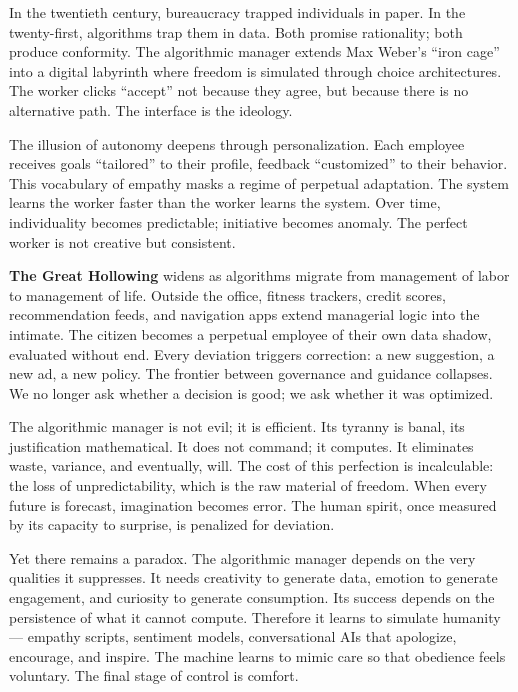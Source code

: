 \documentclass[11pt,twoside]{book}
\begin{document}
In the twentieth century, bureaucracy trapped individuals in paper.  
In the twenty-first, algorithms trap them in data.  
Both promise rationality; both produce conformity.  
The algorithmic manager extends Max Weber’s “iron cage” into a digital labyrinth where freedom is simulated through choice architectures.  
The worker clicks “accept” not because they agree, but because there is no alternative path.  
The interface is the ideology.

The illusion of autonomy deepens through personalization.  
Each employee receives goals “tailored” to their profile, feedback “customized” to their behavior.  
This vocabulary of empathy masks a regime of perpetual adaptation.  
The system learns the worker faster than the worker learns the system.  
Over time, individuality becomes predictable; initiative becomes anomaly.  
The perfect worker is not creative but consistent.

\textbf{The Great Hollowing} widens as algorithms migrate from management of labor to management of life.  
Outside the office, fitness trackers, credit scores, recommendation feeds, and navigation apps extend managerial logic into the intimate.  
The citizen becomes a perpetual employee of their own data shadow, evaluated without end.  
Every deviation triggers correction: a new suggestion, a new ad, a new policy.  
The frontier between governance and guidance collapses.  
We no longer ask whether a decision is good; we ask whether it was optimized.

The algorithmic manager is not evil; it is efficient.  
Its tyranny is banal, its justification mathematical.  
It does not command; it computes.  
It eliminates waste, variance, and eventually, will.  
The cost of this perfection is incalculable: the loss of unpredictability, which is the raw material of freedom.  
When every future is forecast, imagination becomes error.  
The human spirit, once measured by its capacity to surprise, is penalized for deviation.

Yet there remains a paradox.  
The algorithmic manager depends on the very qualities it suppresses.  
It needs creativity to generate data, emotion to generate engagement, and curiosity to generate consumption.  
Its success depends on the persistence of what it cannot compute.  
Therefore it learns to simulate humanity — empathy scripts, sentiment models, conversational AIs that apologize, encourage, and inspire.  
The machine learns to mimic care so that obedience feels voluntary.  
The final stage of control is comfort.
\end{document}

